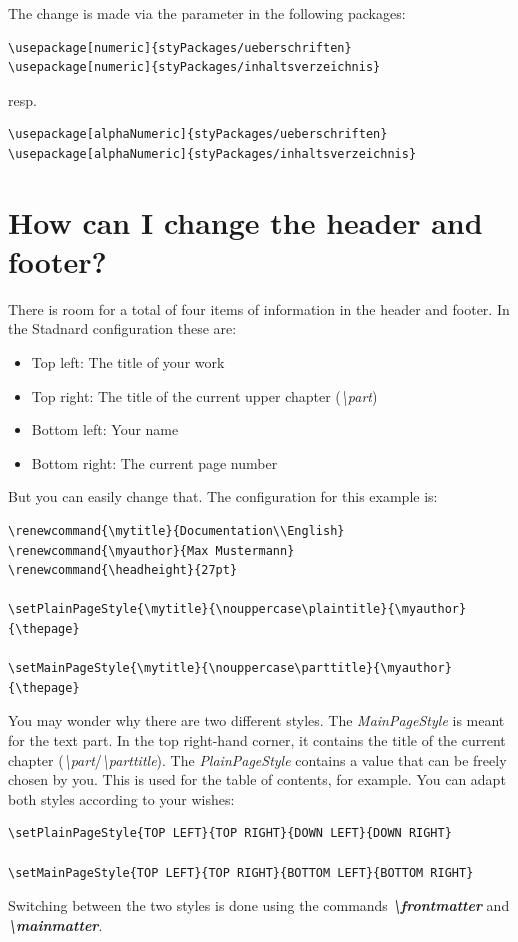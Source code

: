 \documentclass[12pt]{article}
\begin{document}
\noindent The change is made via the parameter in the following packages:
\begin{lstlisting}
\usepackage[numeric]{styPackages/ueberschriften}
\usepackage[numeric]{styPackages/inhaltsverzeichnis}
\end{lstlisting}
resp.
\begin{lstlisting}
\usepackage[alphaNumeric]{styPackages/ueberschriften}
\usepackage[alphaNumeric]{styPackages/inhaltsverzeichnis}
\end{lstlisting}

\section{How can I change the header and footer?}
There is room for a total of four items of information in the header and footer. In the Stadnard configuration these are:
\begin{itemize}
\item Top left: The title of your work
\item Top right: The title of the current upper chapter (\textit{\textbackslash part})
\item Bottom left: Your name
\item Bottom right: The current page number
\end{itemize}
But you can easily change that. The configuration for this example is:
\begin{lstlisting}
\renewcommand{\mytitle}{Documentation\\English}
\renewcommand{\myauthor}{Max Mustermann}
\renewcommand{\headheight}{27pt}

\setPlainPageStyle{\mytitle}{\nouppercase\plaintitle}{\myauthor}{\thepage}

\setMainPageStyle{\mytitle}{\nouppercase\parttitle}{\myauthor}{\thepage}
\end{lstlisting}
You may wonder why there are two different styles. The \textit{MainPageStyle} is meant for the text part. In the top right-hand corner, it contains the title of the current chapter (\textit{\textbackslash part}/\textit{\textbackslash parttitle}). The \textit{PlainPageStyle} contains a value that can be freely chosen by you. This is used for the table of contents, for example.
You can adapt both styles according to your wishes:
\begin{lstlisting}
\setPlainPageStyle{TOP LEFT}{TOP RIGHT}{DOWN LEFT}{DOWN RIGHT}

\setMainPageStyle{TOP LEFT}{TOP RIGHT}{BOTTOM LEFT}{BOTTOM RIGHT}
\end{lstlisting}
Switching between the two styles is done using the commands \textit{\textbf{\textbackslash frontmatter}} and \textit{\textbf{\textbackslash mainmatter}}.
\end{document}
